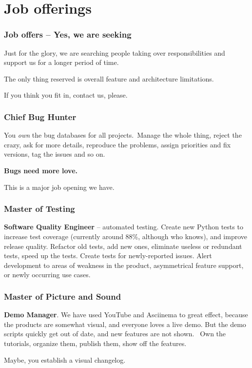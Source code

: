 \documentclass[t,handout]{beamer}
\begin{document}
\section{Job offerings}

\begin{frame}[fragile]\frametitle{Job offers -- Yes, we are seeking}
    \vfill
    Just for the glory, we are searching people taking over responsibilities and support us for a longer period of time.

    The only thing reserved is overall feature and architecture limitations.

    If you think you fit in, contact us, please.
\end{frame}

\begin{frame}[fragile]\frametitle{Chief Bug Hunter}
    \vfill
    You \textit{own} the bug databases for all projects. Manage the whole thing, reject the crazy, ask for more details, reproduce the problems, assign priorities and fix versions, tag the issues and so on.

    \textbf{Bugs need more love.}

    This is a major job opening we have.
\end{frame}

\begin{frame}[fragile]\frametitle{Master of Testing}
    \vfill
    \textbf{Software Quality Engineer} -- automated testing. Create new Python tests to increase test coverage (currently around 88\%, although who knows), and improve release quality. Refactor old tests, add new ones, eliminate useless or redundant tests, speed up the tests. Create tests for newly-reported issues. Alert development to areas of weakness in the product, asymmetrical feature support, or newly occurring use cases.
\end{frame}

\begin{frame}[fragile]\frametitle{Master of Picture and Sound}
    \vfill
    \textbf{Demo Manager}. We have used YouTube and Asciinema to great effect, because the products are somewhat visual, and everyone loves a live demo. But the demo scripts quickly get out of date, and new features are not shown.  Own the tutorials, organize them, publish them, show off the features.

    Maybe, you establish a visual changelog.
\end{frame}
\end{document}

